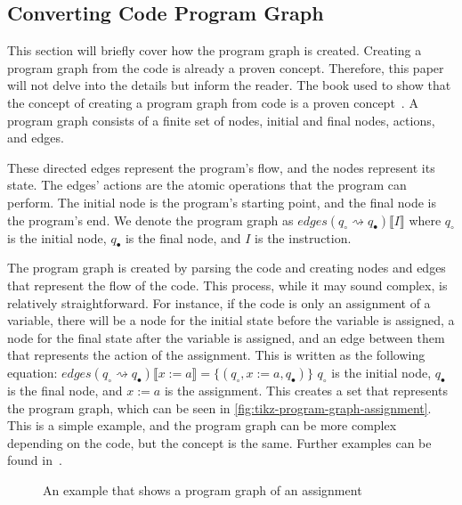 \subsection{Converting Code Program Graph}\label{subsec:converting-code-program-graph}
This section will briefly cover how the program graph is created.
Creating a program graph from the code is already a proven concept.
Therefore, this paper will not delve into the details but inform the reader.
The book used to show that the concept of creating a program graph from code is a proven concept~\cite[see][chap 2.2]{nielson_formal_2019}.
A program graph consists of a finite set of nodes, initial and final nodes, actions, and edges.

These directed edges represent the program's flow, and the nodes represent its state.
The edges' actions are the atomic operations that the program can perform.
The initial node is the program's starting point, and the final node is the program's end.
We denote the program graph as $edges(q_{\circ} \rightsquigarrow q_{\bullet})\llbracket I \rrbracket$ where $q_{\circ}$ is the initial node, $q_{\bullet}$ is the final node, and $I$ is the instruction.

The program graph is created by parsing the code and creating nodes and edges that represent the flow of the code. This process, while it may sound complex, is relatively straightforward. For instance, if the code is only an assignment of a variable, there will be a node for the initial state before the variable is assigned, a node for the final state after the variable is assigned, and an edge between them that represents the action of the assignment. This is written as the following equation:
$edges(q_{\circ} \rightsquigarrow q_{\bullet})\llbracket x:=a \rrbracket = \{(q_{\circ}, x:=a, q_{\bullet})\}$
$q_{\circ}$ is the initial node, $q_{\bullet}$ is the final node, and $x:=a$ is the assignment. This creates a set that represents the program graph, which can be seen in \autoref{fig:tikz-program-graph-assignment}. This is a simple example, and the program graph can be more complex depending on the code, but the concept is the same. Further examples can be found in~\cite[Figure 2.6]{nielson_formal_2019}.

\begin{figure}[htb!]
    \center
    
    \caption{An example that shows a program graph of an assignment}
    \label{fig:tikz-program-graph-assignment}
\end{figure}


